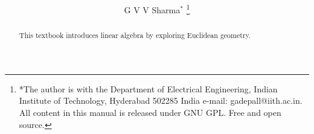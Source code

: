 \documentclass[journal,12pt,twocolumn]{IEEEtran}
\renewcommand\thesection{\arabic{section}}
\begin{document}
\let\StandardTheFigure\thefigure
\renewcommand{\thefigure}{\thesection}



\makeatletter
{}
\makeatother

\let\StandardTheFigure\thefigure
\let\StandardTheTable\thetable
\let\vec\mathbf





\def\putbox#1#2#3{\makebox[0in][l]{\makebox[#1][l]{}\raisebox{\baselineskip}[0in][0in]{\raisebox{#2}[0in][0in]{#3}}}}
     \def\rightbox#1{\makebox[0in][r]{#1}}
     \def\centbox#1{\makebox[0in]{#1}}
     \def\topbox#1{\raisebox{-\baselineskip}[0in][0in]{#1}}
     \def\midbox#1{\raisebox{-0.5\baselineskip}[0in][0in]{#1}}

\vspace{3cm}

\title{ 
}

\author{ G V V Sharma$^{*}$%
	\thanks{*The author is with the Department
		of Electrical Engineering, Indian Institute of Technology, Hyderabad
		502285 India e-mail:  gadepall@iith.ac.in. All content in this manual is released under GNU GPL.  Free and open source.}
	
}	

\maketitle

\tableofcontents

\bigskip

\renewcommand{\thefigure}{\theenumi}
\renewcommand{\thetable}{\theenumi}


\begin{abstract}
	
This textbook  introduces linear algebra by exploring Euclidean geometry.
\end{abstract}
\end{document}
